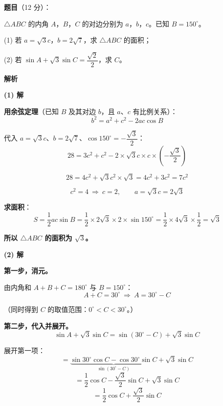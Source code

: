 \begin{answer}

\textbf{题目}（12 分）：

$\triangle ABC$ 的内角 $A$，$B$，$C$ 的对边分别为 $a$，$b$，$c$。已知 $B=150^\circ$。

  (1) 若 $a=\sqrt3c$，$b=2\sqrt7$，求 $\triangle ABC$ 的面积；

  (2) 若 $\sin A+\sqrt3\sin C=\dfrac{\sqrt2}2$，求 $C$。

\textbf{解析}

\par\medskip

\textbf{(1) 解}

\textbf{用余弦定理}（已知 $B$ 及其对边 $b$，且 $a$、$c$ 有比例关系）：
\nopagebreak[4]
\[b^{2}=a^{2}+c^{2}-2ac\cos B\]

代入 $a=\sqrt3c$、$b=2\sqrt7$、$\cos150^\circ=-\dfrac{\sqrt3}2$：
\nopagebreak[4]
\[28=3c^{2}+c^{2}-2\times\sqrt3c\times c\times\left(-\frac{\sqrt3}2\right)\]

\nopagebreak[4]
\[28=4c^{2}+\sqrt3c^{2}\times\sqrt3=4c^{2}+3c^{2}=7c^{2}\]

\nopagebreak[4]
\[c^{2}=4\ \Longrightarrow\ c=2,\qquad a=\sqrt3c=2\sqrt3\]

\textbf{求面积}：
\nopagebreak[4]
\[S=\frac12ac\sin B=\frac12\times2\sqrt3\times2\times\sin150^\circ=\frac12\times4\sqrt3\times\frac12=\sqrt3\]

\textbf{所以 $\triangle ABC$ 的面积为 $\sqrt3$。}

\par\medskip

\textbf{(2) 解}

\textbf{第一步，消元。}

由内角和 $A+B+C=180^\circ$ 与 $B=150^\circ$：
\nopagebreak[4]
\[A+C=30^\circ\ \Longrightarrow\ A=30^\circ-C\]

（同时得到 $C$ 的取值范围：$0^\circ<C<30^\circ$。）

\textbf{第二步，代入并展开。}
\nopagebreak[4]
\[\sin A+\sqrt3\sin C=\sin\left(30^\circ-C\right)+\sqrt3\sin C\]

展开第一项：
\nopagebreak[4]
\[=\underbrace{\sin30^\circ\cos C-\cos30^\circ\sin C}_{\sin(30^\circ-C)}+\sqrt3\sin C\]
\nopagebreak[4]
\[=\frac12\cos C-\frac{\sqrt3}2\sin C+\sqrt3\sin C\]
\nopagebreak[4]
\[=\frac12\cos C+\frac{\sqrt3}2\sin C\]


\end{answer}
